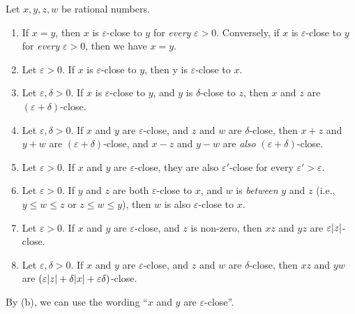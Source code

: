 \begin{proposition} \label{prop 4.3.7}
Let \(x, y, z, w\) be rational numbers.
\begin{enumerate}
    \item
        If \(x = y\), then \(x\) is \(\varepsilon\)-close to \(y\) for \emph{every} \(\varepsilon > 0\).
        Conversely, if \(x\) is \(\varepsilon\)-close to \(y\) for \emph{every} \(\varepsilon > 0\), then we have \(x = y\).
    \item
        Let \(\varepsilon > 0\).
        If \(x\) is \(\varepsilon\)-close to \(y\), then y is \(\varepsilon\)-close to \(x\).
    \item
        Let \(\varepsilon, \delta > 0\).
        If \(x\) is \(\varepsilon\)-close to \(y\), and \(y\) is \(\delta\)-close to \(z\), then \(x\) and \(z\) are \((\varepsilon + \delta)\)-close.
    \item
        Let \(\varepsilon, \delta > 0\).
        If \(x\) and \(y\) are \(\varepsilon\)-close, and \(z\) and \(w\) are \(\delta\)-close,
        then \(x + z\) and \(y + w\) are \((\varepsilon + \delta)\)-close, and \(x - z\) and \(y - w\) are \emph{also} \((\varepsilon + \delta)\)-close.
    \item
        Let \(\varepsilon > 0\).
        If \(x\) and \(y\) are \(\varepsilon\)-close, they are also \(\varepsilon'\)-close for every \(\varepsilon' > \varepsilon\).
    \item
        Let \(\varepsilon > 0\).
        If \(y\) and \(z\) are both \(\varepsilon\)-close to \(x\), and \(w\) is \emph{between} \(y\) and \(z\) (i.e., \(y \le w \le z\) or \(z \le w \le y\)),
        then \(w\) is also \(\varepsilon\)-close to \(x\).
    \item
        Let \(\varepsilon > 0\).
        If \(x\) and \(y\) are \(\varepsilon\)-close, and \(z\) is non-zero, then \(xz\) and \(yz\) are \(\varepsilon\lvert z\rvert\)-close.
    \item
        Let \(\varepsilon, \delta > 0\).
        If \(x\) and \(y\) are \(\varepsilon\)-close, and \(z\) and \(w\) are \(\delta\)-close, then \(xz\) and \(yw\) are \((\varepsilon\lvert z\rvert + \delta\lvert x\rvert + \varepsilon\delta)\)-close.
\end{enumerate}
\end{proposition}

\begin{note}
By (b), we can use the wording ``\(x\) and \(y\) are \(\varepsilon\)-close''.
\end{note}

